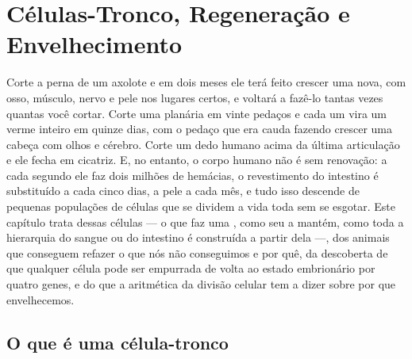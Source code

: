 \chapter{Células-Tronco, Regeneração e Envelhecimento}\label{ch:b3:stem-cells}

Corte a perna de um axolote e em dois meses ele terá feito crescer uma
nova, com osso, músculo, nervo e pele nos lugares certos, e voltará a
fazê-lo tantas vezes quantas você cortar. Corte uma planária em vinte
pedaços e cada um vira um verme inteiro em quinze dias, com o pedaço que
era cauda fazendo crescer uma cabeça com olhos e cérebro. Corte um dedo
humano acima da última articulação e ele fecha em cicatriz. E, no
entanto, o corpo humano não é sem renovação: a cada segundo ele faz dois
milhões de hemácias, o revestimento do intestino é substituído a cada
cinco dias, a pele a cada mês, e tudo isso descende de pequenas
populações de células que se dividem a vida toda sem se esgotar. Este
capítulo trata dessas células --- o que faz uma , como seu
 a mantém, como toda a hierarquia do sangue ou do intestino é
construída a partir dela ---, dos animais que conseguem refazer o que
nós não conseguimos e por quê, da descoberta de que qualquer célula pode
ser empurrada de volta ao estado embrionário por quatro genes, e do que
a aritmética da divisão celular tem a dizer sobre por que envelhecemos.

\section{O que é uma célula-tronco}

